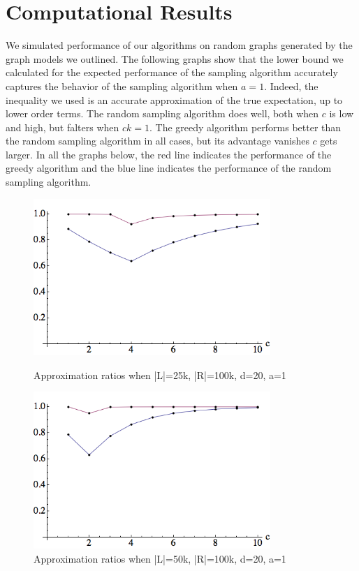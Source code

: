 \section{Computational Results}

We simulated performance of our algorithms on random graphs generated by the graph models we outlined. The following graphs show that the lower bound we calculated for the expected performance of the sampling algorithm accurately captures the behavior of the sampling algorithm when $a=1$. Indeed, the inequality we used is an accurate approximation of the true expectation, up to lower order terms. The random sampling algorithm does well, both when $c$ is low and high, but falters when $ck=1$. The greedy algorithm performs better than the random sampling algorithm in all cases, but its advantage vanishes $c$ gets larger. In all the graphs below, the red line indicates the performance of the greedy algorithm and the blue line indicates the performance of the random sampling algorithm.

\begin{figure}[h]
\centering
\begin{minipage}[h]{0.45\textwidth}
\centering
\includegraphics[width=0.8\textwidth]{images/l=25000,r=100000_Greedy_vs_Naive.png}
\caption{Approximation ratios when |L|=25k, |R|=100k, d=20, a=1}
\end{minipage}
\hspace{0.2cm}
\begin{minipage}[h]{0.45\textwidth}
\centering
\includegraphics[width=0.8\textwidth]{images/l=50000,r=100000_Greedy_vs_Naive.png}
\caption{Approximation ratios when |L|=50k, |R|=100k, d=20, a=1}
\end{minipage}
\end{figure}

